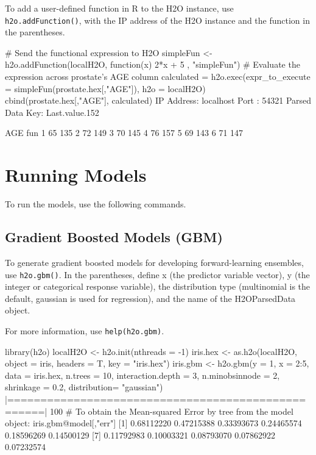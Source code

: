 To add a user-defined function in R to the H2O instance, use {\texttt{h2o.addFunction()}}, with the IP address of the H2O instance and the function in the parentheses.  
\begin{spverbatim}
# Send the functional expression to H2O
simpleFun <- h2o.addFunction(localH2O, function(x) { 2*x + 5 }, "simpleFun")
# Evaluate the expression across prostate's AGE column
calculated = h2o.exec(expr_to_execute = simpleFun(prostate.hex[,"AGE"]), h2o = localH2O)
cbind(prostate.hex[,"AGE"], calculated)
IP Address: localhost 
Port      : 54321 
Parsed Data Key: Last.value.152 

  AGE fun
1  65 135
2  72 149
3  70 145
4  76 157
5  69 143
6  71 147
\end{spverbatim}


\section{Running Models}

To run the models, use the following commands. 
\subsection{Gradient Boosted Models (GBM)}
To generate gradient boosted models for developing forward-learning ensembles, use {\texttt{h2o.gbm()}}.  In the parentheses, define x (the predictor variable vector), y (the integer or categorical response variable), the distribution type (multinomial is the default, gaussian is used for regression), and the name of the H2OParsedData object. 

For more information, use {\texttt{help(h2o.gbm)}}.
\begin{spverbatim}
library(h2o)
localH2O <- h2o.init(nthreads = -1)
iris.hex <- as.h2o(localH2O, object = iris, headers = T, key = "iris.hex")
iris.gbm <- h2o.gbm(y = 1, x = 2:5, data = iris.hex, n.trees = 10,
interaction.depth = 3, n.minobsinnode = 2, shrinkage = 0.2, distribution= "gaussian")
|===================================================| 100%
# To obtain the Mean-squared Error by tree from the model object:
iris.gbm@model[,"err"]
 [1] 0.68112220 0.47215388 0.33393673 0.24465574 0.18596269 0.14500129
 [7] 0.11792983 0.10003321 0.08793070 0.07862922 0.07232574

\end{spverbatim}

